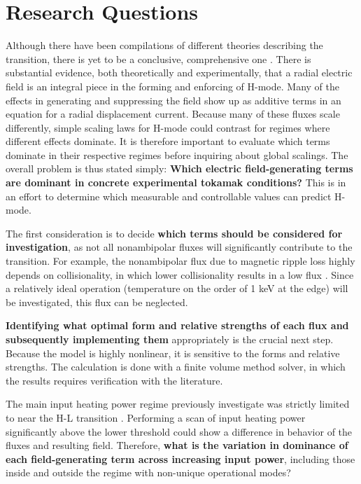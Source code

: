 \section{Research Questions}
Although there have been compilations of different theories describing the transition, there is yet to be a conclusive, comprehensive one \cite{connor_review_2000}.
There is substantial evidence, both theoretically and experimentally, that a radial electric field is an integral piece in the forming and enforcing of H-mode.
Many of the effects in generating and suppressing the field show up as additive terms in an equation for a radial displacement current.
Because many of these fluxes scale differently, simple scaling laws for H-mode could contrast for regimes where different effects dominate.
It is therefore important to evaluate which terms dominate in their respective regimes before inquiring about global scalings.
The overall problem is thus stated simply: \textbf{Which electric field-generating terms are dominant in concrete experimental tokamak conditions?}
This is in an effort to determine which measurable and controllable values can predict H-mode.

The first consideration is to decide \textbf{which terms should be considered for investigation}, as not all nonambipolar fluxes will significantly contribute to the transition.
For example, the nonambipolar flux due to magnetic ripple loss highly depends on collisionality, in which lower collisionality results in a low flux \cite{stringer_ripple_1972}.
Since a relatively ideal operation (temperature on the order of 1 keV at the edge) will be investigated, this flux can be neglected.

\textbf{Identifying what optimal form and relative strengths of each flux and subsequently implementing them} appropriately is the crucial next step.
Because the model is highly nonlinear, it is sensitive to the forms and relative strengths.
The calculation is done with a finite volume method solver, in which the results requires verification with the literature.

The main input heating power regime previously investigate was strictly limited to near the H-L transition \cite{staps_backstepping_2017}.
Performing a scan of input heating power significantly above the lower threshold could show a difference in behavior of the fluxes and resulting field.
Therefore, \textbf{what is the variation in dominance of each field-generating term across increasing input power}, including those inside and outside the regime with non-unique operational modes?

